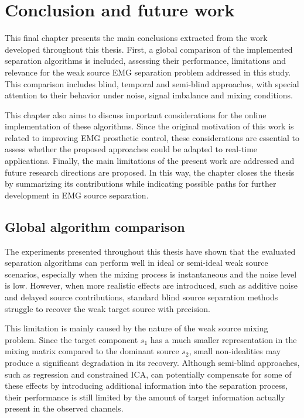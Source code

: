 \chapter{Conclusion and future work}

This final chapter presents the main conclusions extracted from the work developed throughout this thesis. First, a global comparison of the implemented separation algorithms is included, assessing their performance,  limitations and relevance for the weak source EMG separation problem addressed in this study. This comparison includes blind, temporal and semi-blind approaches, with special attention to their behavior under noise, signal imbalance and mixing conditions.

This chapter also aims to discuss important considerations for the online implementation of these algorithms. Since the original motivation of this work is related to improving EMG prosthetic control, these considerations are essential to assess whether the proposed approaches could be adapted to real-time applications. Finally, the main limitations of the present work are addressed and future research directions are proposed. In this way, the chapter closes the thesis by summarizing its contributions while indicating possible paths for further development in EMG source separation.

\section{Global algorithm comparison}

The experiments presented throughout this thesis have shown that the evaluated separation algorithms can perform well in ideal or semi-ideal weak source scenarios, especially when the mixing process is instantaneous and the noise level is low. However, when more realistic effects are introduced, such as additive noise and delayed source contributions, standard blind source separation methods struggle to recover the weak target source with precision.

This limitation is mainly caused by the nature of the weak source mixing problem. Since the target component $s_1$ has a much smaller representation in the mixing matrix compared to the dominant source $s_2$, small non-idealities may produce a significant degradation in its recovery. Although semi-blind approaches, such as regression and constrained ICA, can potentially  compensate for some of these effects by introducing additional information into the separation process, their performance is still limited by the amount of target information actually present in the observed channels.

